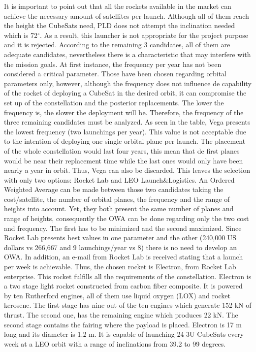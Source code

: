 \newline\newline
It is important to point out that all the rockets available in the market can achieve the necessary amount of satellites per launch. Although all of them reach the height the CubeSats need, PLD does not attempt the inclination needed which is 72$^{\circ}$. As a result, this launcher is not appropriate for the project purpose and it is rejected. 
According to the remaining 3 candidates, all of them are adequate candidates, nevertheless there is a characteristic that may interfere with the mission goals. At first instance, the frequency per year has not been considered a critical parameter. Those have been chosen regarding orbital parameters only, however, although the frequency does not influence de capability of the rocket of deploying a CubeSat in the desired orbit, it can compromise the set up of the constellation and the posterior replacements. The lower the frequency is, the slower the deployment will be. Therefore, the frequency of the three remaining candidates must be analyzed. As seen in the table, Vega presents the lowest frequency (two launchings per year). This value is not acceptable due to the intention of deploying one single orbital plane per launch. The placement of the whole constellation would last four years, this mean that de first planes would be near their replacement time while the last ones would only have been nearly a year in orbit. Thus, Vega can also be discarded. 
This leaves the selection with only two options: Rocket Lab and LEO Launch\&Logistics. An Ordered Weighted Average can be made between those two candidates taking the cost/satellite, the number of orbital planes, the frequency and the range of heights into account. Yet, they both present the same number of planes and range of heights, consequently the OWA can be done regarding only the two cost and frequency. The first has to be minimized and the second maximized. Since Rocket Lab presents best values in one parameter and the other (240,000 US dollars vs 266,667 and 9 launchings/year vs 8) there is no need to develop an OWA. In addition, an e-mail from Rocket Lab is received stating that a launch per week is achievable. Thus, the chosen rocket is Electron, from Rocket Lab enterprise. This rocket fulfills all the requirements of the constellation. 
\newline\newline
Electron is a two stage light rocket constructed from carbon fiber composite. It is powered by ten Rutherford engines, all of them use liquid oxygen (LOX) and rocket kerosene. The first stage has nine out of the ten engines which generate 152 kN of thrust. The second one, has the remaining engine which produces 22 kN. The second stage contains the fairing where the payload is placed. Electron is 17 m long and its diameter is 1.2 m. It is capable of launching 24 3U CubeSats every week at a LEO orbit with a range of inclinations from 39.2 to 99 degrees. 
